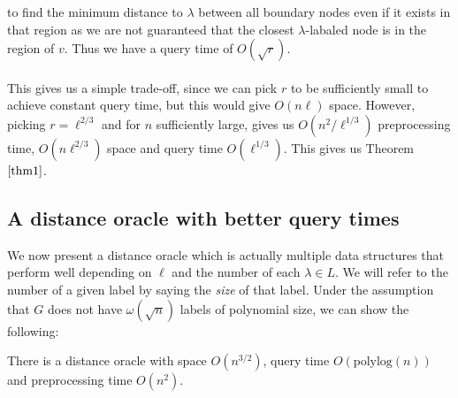 to find the minimum distance to $\lambda$ between all boundary nodes even if it exists in
that region as we are not guaranteed that the closest $\lambda$-labaled node is in the
region of $v$. Thus we have a query time of $O(\sqrt{r})$. \\
\\
This gives us a simple trade-off, since we can pick $r$ to be sufficiently small to
achieve constant query time, but this would give $O(n\ell)$ space. However, picking
$r=\ell^{2/3}$ and for $n$ sufficiently large, gives us $O(n^2/\ell^{1/3})$ preprocessing time, $O(n\ell^{2/3})$ space and query time $O(\ell^{1/3})$. This gives us Theorem $\ref{thm1}$.

\subsection{A distance oracle with better query times}\label{oracle2}
We now present a distance oracle which is actually multiple data structures that perform
well depending on $\ell$ and the number of each $\lambda\in L$. We will refer to the
number of a given label by saying the \textit{size} of that label. Under the assumption
that $G$ does not have $\omega(\sqrt{n})$ labels of polynomial size, we can show the
following:
\begin{thm}\label{thm2}
  There is a distance oracle with space $O(n^{3/2})$, query time $O(\text{polylog}(n))$ and
  preprocessing time $O(n^2)$.
\end{thm}

